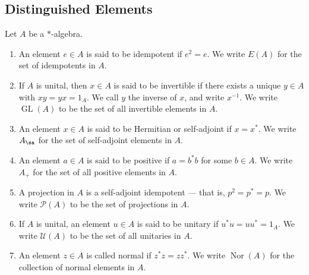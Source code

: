 \documentclass[10pt]{mypackage}
\begin{document}
\subsection{Distinguished Elements}%
\begin{definition}
  Let $A$ be a $\ast$-algebra.
  \begin{enumerate}[(1)]
    \item An element $e\in A$ is said to be idempotent if $e^2 = e$. We write $E(A)$ for the set of idempotents in $A$.
    \item If $A$ is unital, then $x\in A$ is said to be invertible if there exists a unique $y\in A$ with $xy=yx = 1_A$. We call $y$ the inverse of $x$, and write $x^{-1}$. We write $\operatorname{GL}\left(A\right)$ to be the set of all invertible elements in $A$.
    \item An element $x\in A$ is said to be Hermitian or self-adjoint if $x = x^{\ast}$. We write $A_{\sa}$ for the set of self-adjoint elements in $A$.
    \item An element $a\in A$ is said to be positive if $a = b^{\ast}b$ for some $b\in A$. We write $A_{+}$ for the set of all positive elements in $A$.
    \item A projection in $A$ is a self-adjoint idempotent --- that is, $p^2 = p^{\ast} = p$. We write $\mathcal{P}\left(A\right)$ to be the set of projections in $A$.
    \item If $A$ is unital, an element $u\in A$ is said to be unitary if $u^{\ast}u = uu^{\ast}=  1_A$. We write $\mathcal{U}\left(A\right)$ to be the set of all unitaries in $A$.
    \item An element $z\in A$ is called normal if $z^{\ast}z = zz^{\ast}$. We write $\operatorname{Nor}\left(A\right)$ for the collection of normal elements in $A$.
  \end{enumerate}
\end{definition}
\end{document}
